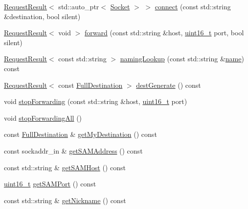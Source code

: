 \begin{DoxyCompactItemize}
\hyperlink{struct_s_a_m_1_1_request_result}{Request\+Result}$<$ std\+::auto\+\_\+ptr$<$ \hyperlink{class_s_a_m_1_1_socket}{Socket} $>$ $>$ \hyperlink{class_s_a_m_1_1_stream_session_abc8b96738b75e87f5bee150a3cc429de}{connect} (const std\+::string \&destination, bool silent)
\item 
\hyperlink{struct_s_a_m_1_1_request_result}{Request\+Result}$<$ void $>$ \hyperlink{class_s_a_m_1_1_stream_session_a3bedd8a940e2aaa7f4f8d48104f76f10}{forward} (const std\+::string \&host, \hyperlink{stdint_8h_a273cf69d639a59973b6019625df33e30}{uint16\+\_\+t} port, bool silent)
\item 
\hyperlink{struct_s_a_m_1_1_request_result}{Request\+Result}$<$ const std\+::string $>$ \hyperlink{class_s_a_m_1_1_stream_session_a0012bce074246b8e2835454ff9b07b64}{naming\+Lookup} (const std\+::string \&\hyperlink{testharness_8cc_a8f8f80d37794cde9472343e4487ba3eb}{name}) const 
\item 
\hyperlink{struct_s_a_m_1_1_request_result}{Request\+Result}$<$ const \hyperlink{struct_s_a_m_1_1_full_destination}{Full\+Destination} $>$ \hyperlink{class_s_a_m_1_1_stream_session_a72e00a933a57b4ca043d5fab8ce893cc}{dest\+Generate} () const 
\item 
void \hyperlink{class_s_a_m_1_1_stream_session_a127c62ec5650d71753950189a60c98af}{stop\+Forwarding} (const std\+::string \&host, \hyperlink{stdint_8h_a273cf69d639a59973b6019625df33e30}{uint16\+\_\+t} port)
\item 
void \hyperlink{class_s_a_m_1_1_stream_session_a3dc7da81392eb7d1b29d35c3855407ba}{stop\+Forwarding\+All} ()
\item 
const \hyperlink{struct_s_a_m_1_1_full_destination}{Full\+Destination} \& \hyperlink{class_s_a_m_1_1_stream_session_aee96e585ccb015b67d62f3e1da6d2b9d}{get\+My\+Destination} () const 
\item 
const sockaddr\+\_\+in \& \hyperlink{class_s_a_m_1_1_stream_session_a19c6827c117adbba8ac397b7e83cbaba}{get\+S\+A\+M\+Address} () const 
\item 
const std\+::string \& \hyperlink{class_s_a_m_1_1_stream_session_a0a2f78d4ae80e6748a7f936516987e0b}{get\+S\+A\+M\+Host} () const 
\item 
\hyperlink{stdint_8h_a273cf69d639a59973b6019625df33e30}{uint16\+\_\+t} \hyperlink{class_s_a_m_1_1_stream_session_a5951e00617284abfc95f8885ccd178ad}{get\+S\+A\+M\+Port} () const 
\item 
const std\+::string \& \hyperlink{class_s_a_m_1_1_stream_session_a8883fa512aad5b7fac95559c45682c5b}{get\+Nickname} () const 

\end{DoxyCompactItemize}
